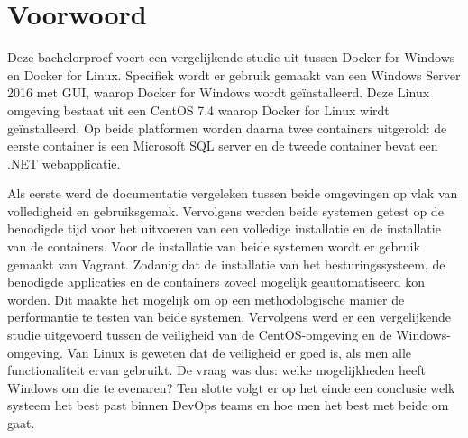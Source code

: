 
\chapter*{Voorwoord}
\label{ch:voorwoord}



Deze bachelorproef voert een vergelijkende studie uit tussen Docker for Windows en Docker for Linux. Specifiek wordt er gebruik gemaakt van een Windows Server 2016 met GUI, waarop Docker for Windows wordt geïnstalleerd. Deze Linux omgeving bestaat uit een CentOS 7.4 waarop Docker for Linux wirdt geïnstalleerd. Op beide platformen worden daarna twee containers uitgerold: de eerste container is een Microsoft SQL server en de tweede container bevat een .NET webapplicatie.

Als eerste werd de documentatie vergeleken tussen beide omgevingen op vlak van volledigheid en gebruiksgemak.
Vervolgens werden beide systemen getest op de benodigde tijd voor het uitvoeren van een volledige installatie en de installatie van de containers. Voor de installatie van beide systemen wordt er gebruik gemaakt van Vagrant. Zodanig dat de installatie van het besturingssysteem, de benodigde applicaties en de containers zoveel mogelijk geautomatiseerd kon worden. Dit maakte het mogelijk om op een methodologische manier de performantie te testen van beide systemen.
Vervolgens werd er een vergelijkende studie uitgevoerd tussen de veiligheid van de CentOS-omgeving en de Windows-omgeving. Van Linux is geweten dat de veiligheid er goed is, als men alle functionaliteit ervan gebruikt. De vraag was dus: welke mogelijkheden heeft Windows om die te evenaren?
Ten slotte volgt er op het einde een conclusie welk systeem het best past binnen DevOps teams en hoe men het best met beide om gaat.

